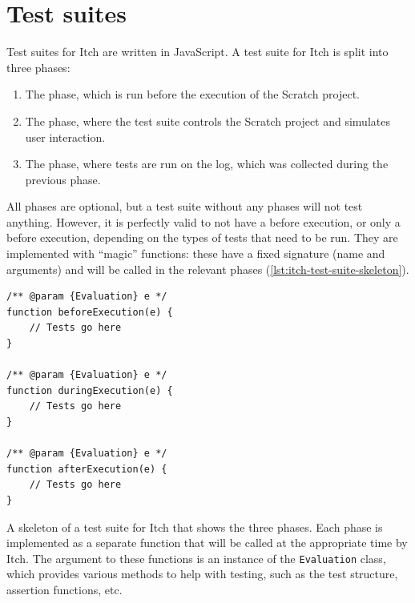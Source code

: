 \documentclass[../main]{subfiles}
\begin{document}
%

\section{Test suites}\label{sec:itch-test-suites}

Test suites for Itch are written in JavaScript.
A test suite for Itch is split into three phases:

\begin{enumerate}
    \item The  phase, which is run before the execution of the Scratch project.
    \item The  phase, where the test suite controls the Scratch project and simulates user interaction.
    \item The  phase, where tests are run on the log, which was collected during the previous phase.
\end{enumerate}

All phases are optional, but a test suite without any phases will not test anything.
However, it is perfectly valid to not have a before execution, or only a before execution, depending on the types of tests that need to be run.
They are implemented with ``magic'' functions: these have a fixed signature (name and arguments) and will be called in the relevant phases (\cref{lst:itch-test-suite-skeleton}).

\begin{listing}
    \begin{verbatim}
/** @param {Evaluation} e */
function beforeExecution(e) {
    // Tests go here
}

/** @param {Evaluation} e */
function duringExecution(e) {
    // Tests go here
}

/** @param {Evaluation} e */
function afterExecution(e) {
    // Tests go here
}
    \end{verbatim}
    \caption[]{
        A skeleton of a test suite for Itch that shows the three phases.
        Each phase is implemented as a separate function that will be called at the appropriate time by Itch.
        The argument to these functions is an instance of the \texttt{Evaluation} class, which provides various methods to help with testing, such as the test structure, assertion functions, etc.
    }
    \label{lst:itch-test-suite-skeleton}
\end{listing}
\end{document}

